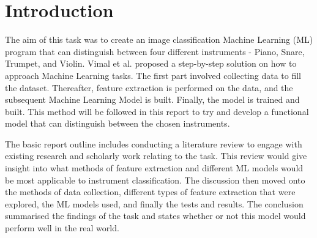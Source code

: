 \section{Introduction}

The aim of this task was to create an image classification Machine Learning (ML) program that can distinguish between four different instruments - Piano, Snare, Trumpet, and Violin. Vimal et al. proposed a step-by-step solution on how to approach Machine Learning tasks. The first part involved collecting data to fill the dataset. Thereafter, feature extraction is performed on the data, and the subsequent Machine Learning Model is built. Finally, the model is trained and built. This method will be followed in this report to try and develop a functional model that can distinguish between the chosen instruments. 

The basic report outline includes conducting a literature review to engage with existing research and scholarly work relating to the task. This review would give insight into what methods of feature extraction and different ML models would be most applicable to instrument classification. The discussion then moved onto the methods of data collection, different types of feature extraction that were explored, the ML models used, and finally the tests and results. The conclusion summarised the findings of the task and states whether or not this model would perform well in the real world. 
